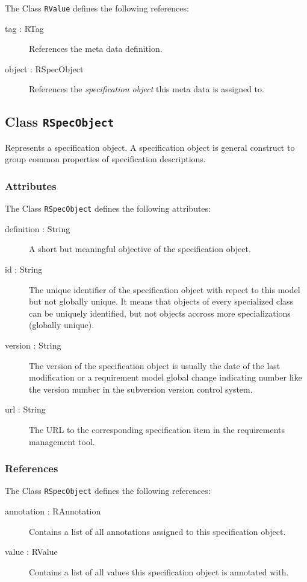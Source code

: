 The Class \verb|RValue| defines the following references:

\begin{description}
	\item[tag : RTag] References the meta data definition.
	\item[object : RSpecObject] References the \emph{specification object} this meta data is assigned to.
\end{description}

\subsection{Class {\tt RSpecObject}}

Represents a specification object.
A specification object is general construct to group common properties of specification descriptions.

\subsubsection{Attributes}

The Class \verb|RSpecObject| defines the following attributes:

\begin{description}
	\item[definition : String] A short but meaningful objective of the specification object.
	\item[id : String] The unique identifier of the specification object with repect to this model but not globally unique.
It means that objects of every specialized class can be uniquely identified, but not objects accross more specializations (globally unique).
	\item[version : String] The version of the specification object is usually the date of the last modification or a requirement model global change indicating number like the version number in the subversion version control system.
	\item[url : String] The URL to the corresponding specification item in the requirements management tool.
\end{description}
\subsubsection{References}

The Class \verb|RSpecObject| defines the following references:

\begin{description}
	\item[annotation : RAnnotation] Contains a list of all annotations assigned to this specification object.
	\item[value : RValue] Contains a list of all values this specification object is annotated with.
\end{description}

